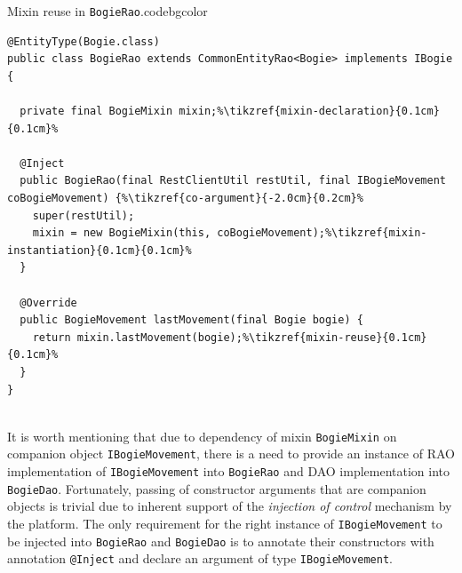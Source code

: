   \begin{code}{Mixin reuse in \texttt{BogieRao}.}{\label{lst:ch02:00:BogieRao-mixin}}{codebgcolor}
  \begin{lstlisting}
@EntityType(Bogie.class)
public class BogieRao extends CommonEntityRao<Bogie> implements IBogie {
  
  private final BogieMixin mixin;%\tikzref{mixin-declaration}{0.1cm}{0.1cm}%
  
  @Inject
  public BogieRao(final RestClientUtil restUtil, final IBogieMovement coBogieMovement) {%\tikzref{co-argument}{-2.0cm}{0.2cm}%
    super(restUtil);
    mixin = new BogieMixin(this, coBogieMovement);%\tikzref{mixin-instantiation}{0.1cm}{0.1cm}%
  }

  @Override
  public BogieMovement lastMovement(final Bogie bogie) { 
    return mixin.lastMovement(bogie);%\tikzref{mixin-reuse}{0.1cm}{0.1cm}%
  }
}
  
  \end{lstlisting}
  \vspace*{-7px}
\end{code}  

  It is worth mentioning that due to dependency of mixin \texttt{BogieMixin} on companion object \texttt{IBogieMovement}, there is a need to provide an instance of RAO implementation of \texttt{IBogieMovement} into \texttt{BogieRao} and DAO implementation into \texttt{BogieDao}.
  Fortunately, passing of constructor arguments that are companion objects is trivial due to inherent support of the \emph{injection of control} mechanism by the platform.
  The only requirement for the right instance of \texttt{IBogieMovement} to be injected into \texttt{BogieRao} and \texttt{BogieDao} is to annotate their constructors with annotation \texttt{@Inject} and declare an argument of type \texttt{IBogieMovement}.

